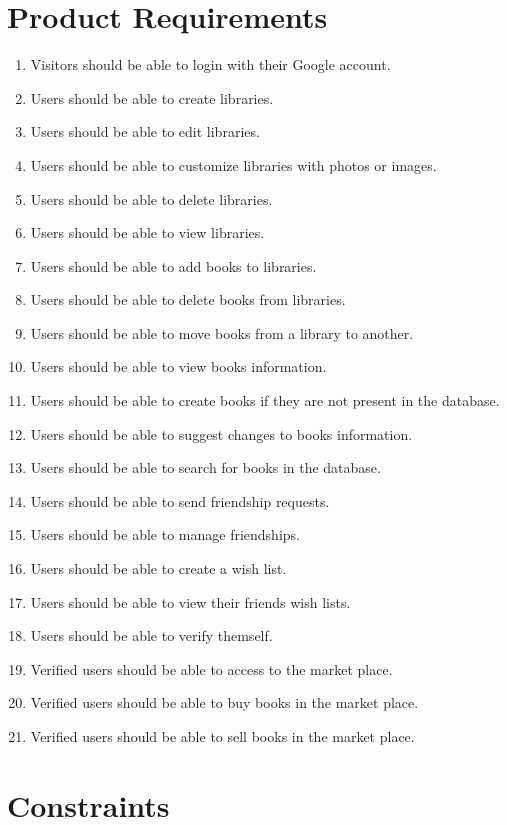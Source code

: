 \section{Product Requirements}
\begin{enumerate}
    \item Visitors should be able to login with their Google account.
    \item Users should be able to create libraries.
    \item Users should be able to edit libraries.
    \item Users should be able to customize libraries with photos or images.
    \item Users should be able to delete libraries.
    \item Users should be able to view libraries.
    \item Users should be able to add books to libraries.
    \item Users should be able to delete books from libraries.
    \item Users should be able to move books from a library to another.
    \item Users should be able to view books information.
    \item Users should be able to create books if they are not present in the database.
    \item Users should be able to suggest changes to books information.
    \item Users should be able to search for books in the database.
    \item Users should be able to send friendship requests.
    \item Users should be able to manage friendships.
    \item Users should be able to create a wish list.
    \item Users should be able to view their friends wish lists.
    \item Users should be able to verify themself.
    \item Verified users should be able to access to the market place.
    \item Verified users should be able to buy books in the market place.
    \item Verified users should be able to sell books in the market place.
\end{enumerate}

\section{Constraints}

